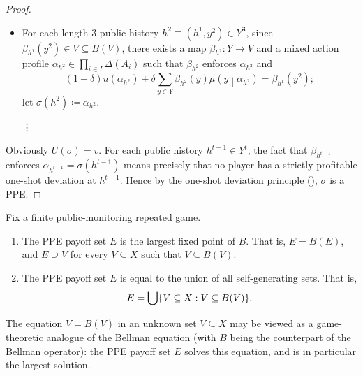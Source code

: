 \begin{proof}
\begin{itemize}
		\item For each length-$3$ public history $h^2 \equiv \left(h^1,y^2\right) \in Y^3$, since $\beta_{h^1}\left( y^2 \right) \in V \subseteq B(V)$, there exists a map $\beta_{h^2} : Y \to V$ and a mixed action profile $\alpha_{h^2} \in \prod_{i \in I} \Delta(A_i)$ such that $\beta_{h^2}$ enforces $\alpha_{h^2}$ and
		\begin{equation*}
			(1-\delta) u\left(\alpha_{h^2}\right)
			+ \delta \sum_{y \in Y} \beta_{h^2}(y) \mu\left(y\middle|\alpha_{h^2}\right) 
			= \beta_{h^1}\left( y^2 \right) ;
		\end{equation*}
		let $\sigma\left( h^2 \right) \coloneqq \alpha_{h^2}$.

		\item[\vdots]
	
	\end{itemize}
	Obviously $U(\sigma) = v$. For each public history $h^{t-1} \in Y^t$, the fact that $\beta_{h^{t-1}}$ enforces $\alpha_{h^{t-1}} = \sigma\left( h^{t-1} \right)$ means precisely that no player has a strictly profitable one-shot deviation at $h^{t-1}$. Hence by the one-shot deviation principle (), $\sigma$ is a PPE.
\end{proof}

\begin{theorem}
	\label{theorem:self-gen_max_ppe}
	Fix a finite public-monitoring repeated game.

	\begin{enumerate}[label=(\alph*)]

		\item The PPE payoff set $E$ is the largest fixed point of $B$. That is, $E = B(E)$, and $E \supseteq V$ for every $V \subseteq X$ such that $V \subseteq B(V)$.
	
		\item The PPE payoff set $E$ is equal to the union of all self-generating sets. That is,
		\begin{equation*}
			E = \Union \left\{ V \subseteq X : V \subseteq B(V) \right\} .
		\end{equation*}
	
	\end{enumerate}
\end{theorem}

The equation $V = B(V)$ in an unknown set $V \subseteq X$ may be viewed as a game-theoretic analogue of the Bellman equation (with $B$ being the counterpart of the Bellman operator): the PPE payoff set $E$ solves this equation, and is in particular the largest solution. 

